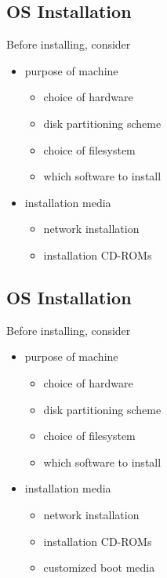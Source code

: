 \documentclass[xga]{xdvislides}
\begin{document}
\subsection{OS Installation}
Before installing, consider
\begin{itemize}
	\item purpose of machine
		\begin{itemize}
			\item choice of hardware
			\item disk partitioning scheme
			\item choice of filesystem
			\item which software to install
		\end{itemize}
	\item installation media
		\begin{itemize}
			\item network installation
			\item installation CD-ROMs
		\end{itemize}
\end{itemize}

\subsection{OS Installation}
Before installing, consider
\begin{itemize}
	\item purpose of machine
		\begin{itemize}
			\item choice of hardware
			\item disk partitioning scheme
			\item choice of filesystem
			\item which software to install
		\end{itemize}
	\item installation media
		\begin{itemize}
			\item network installation
			\item installation CD-ROMs
			\item customized boot media
		\end{itemize}
\end{itemize}
\end{document}
